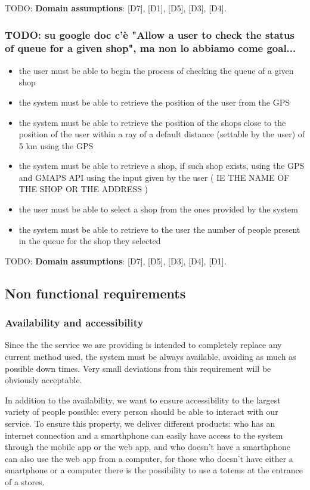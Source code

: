 TODO: \textbf{Domain assumptions}: [D7], [D1], [D5], [D3], [D4].

\subsubsection{TODO: su google doc c'è "Allow a user to check the status of queue for a given shop", ma non lo abbiamo come goal...}
\label{subsubsect:TODO}

\begin{itemize}[topsep=0pt]
    \item the user must be able to begin the process of checking the queue of a given shop
    \item the system must be able to retrieve the position of the user from the GPS
    \item the system must be able to retrieve the position of the shops close to the position of the user within a ray of a default distance (settable by the user) of 5 km using the GPS
    \item the system must be able to retrieve a shop, if such shop exists, using the GPS  and GMAPS API using the input given by the user ( IE THE NAME OF THE SHOP OR THE ADDRESS )
    \item the user must be able to select a shop from the ones provided by the system
    \item the system must be able to retrieve to the user the number of people present in the queue for the shop they selected
\end{itemize}

TODO: \textbf{Domain assumptions}: [D7], [D5], [D3], [D4], [D1].

\subsection{Non functional requirements}
\label{subsect:softwaresystemattributes}

\subsubsection{Availability and accessibility}
\label{subsubsect:availabilityandaccessibility}

Since the the service we are providing is intended to completely replace any current method used, the system must be always available, avoiding as much as possible down times. Very small deviations from this requirement will be obviously acceptable.

In addition to the availability, we want to ensure accessibility to the largest variety of people possible: every person should be able to interact with our service. To ensure this property, we deliver different products: who has an internet connection and a smarthphone can easily have access to the system through the mobile app or the web app, and who doesn't have a smarthphone can also use the web app from a computer, for those who doesn't have either a smartphone or a computer there is the possibility to use a totems at the entrance of a stores.

